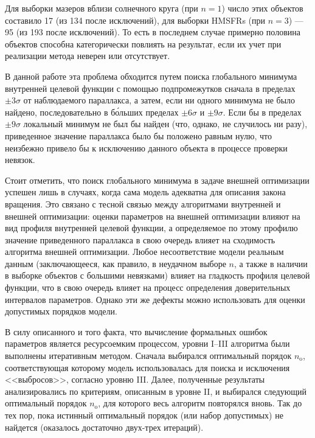 \documentclass[a4paper, oneside, 14pt]{article}
\begin{document}
Для выборки мазеров вблизи солнечного круга (при $ n = 1 $) число этих объектов составило 17 (из 134 после исключений), для выборки HMSFRs (при $ n = 3 $) --- 95 (из 193 после исключений). То есть в последнем случае примерно половина объектов способна категорически повлиять на результат, если их учет при реализации метода неверен или отсутствует.

В данной работе эта проблема обходится путем поиска глобального минимума внутренней целевой функции с помощью подпромежутков сначала в пределах $ \pm 3 \sigma $ от наблюдаемого параллакса, а затем, если ни одного минимума не было найдено, последовательно в б\'{о}льших пределах $ \pm 6 \sigma $ и $ \pm 9 \sigma $. Если бы в пределах $ \pm 9 \sigma $ локальный минимум не был бы найден (что, однако, не случилось ни разу), приведенное значение параллакса было бы положено равным нулю, что неизбежно привело бы к исключению данного объекта в процессе проверки невязок.

Стоит отметить, что поиск глобального минимума в задаче внешней оптимизации успешен лишь в случаях, когда сама модель адекватна для описания закона вращения. Это связано с тесной связью между алгоритмами внутренней и внешней оптимизации: оценки параметров на внешней оптимизации влияют на вид профиля внутренней целевой функции, а определяемое по этому профилю значение приведенного параллакса в свою очередь влияет на сходимость алгоритма внешней оптимизации. Любое несоответствие модели реальным данным (заключающееся, как правило, в неудачном выборе $ n $, а также в наличии в выборке объектов с большими невязками) влияет на гладкость профиля целевой функции, что в свою очередь влияет на процесс определения доверительных интервалов параметров. Однако эти же дефекты можно использовать для оценки допустимых порядков модели.

В силу описанного и того факта, что вычисление формальных ошибок параметров является ресурсоемким процессом, уровни I--III алгоритма были выполнены итеративным методом. Сначала выбирался оптимальный порядок $ n_\text{o} $, соответствующая которому модель использовалась для поиска и исключения <<выбросов>>, согласно уровню III. Далее, полученные результаты анализировались по критериям, описанным в уровне II, и выбирался следующий оптимальный порядок $ n_\text{o} $, для которого весь алгоритм повторялся вновь. Так до тех пор, пока истинный оптимальный порядок (или набор допустимых) не найдется (оказалось достаточно двух-трех итераций).

\clearpage
\end{document}
